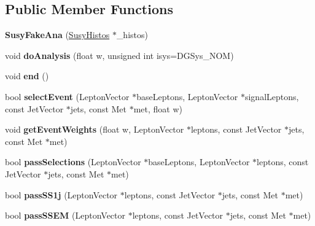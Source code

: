 \subsection*{Public Member Functions}
\begin{DoxyCompactItemize}
\item 
\hypertarget{classSusyFakeAna_ac092fb9efc326ae084d888501bdfa818}{
{\bfseries SusyFakeAna} (\hyperlink{classSusyHistos}{SusyHistos} $\ast$\_\-histos)}
\label{classSusyFakeAna_ac092fb9efc326ae084d888501bdfa818}

\item 
\hypertarget{classSusyFakeAna_a28b10622b8d67eacee73cf2e1999903f}{
void {\bfseries doAnalysis} (float w, unsigned int isys=DGSys\_\-NOM)}
\label{classSusyFakeAna_a28b10622b8d67eacee73cf2e1999903f}

\item 
\hypertarget{classSusyFakeAna_a6b73ce1990391a6b0c56f866f7212d47}{
void {\bfseries end} ()}
\label{classSusyFakeAna_a6b73ce1990391a6b0c56f866f7212d47}

\item 
\hypertarget{classSusyFakeAna_a78bf4f98f92485fa76342ec8b2d628c7}{
bool {\bfseries selectEvent} (LeptonVector $\ast$baseLeptons, LeptonVector $\ast$signalLeptons, const JetVector $\ast$jets, const Met $\ast$met, float w)}
\label{classSusyFakeAna_a78bf4f98f92485fa76342ec8b2d628c7}

\item 
\hypertarget{classSusyFakeAna_aadf34572b99c75663a542a95b65b8539}{
void {\bfseries getEventWeights} (float w, LeptonVector $\ast$leptons, const JetVector $\ast$jets, const Met $\ast$met)}
\label{classSusyFakeAna_aadf34572b99c75663a542a95b65b8539}

\item 
\hypertarget{classSusyFakeAna_ac10b9f9e353c44f69ffa1076c0350060}{
bool {\bfseries passSelections} (LeptonVector $\ast$baseLeptons, LeptonVector $\ast$leptons, const JetVector $\ast$jets, const Met $\ast$met)}
\label{classSusyFakeAna_ac10b9f9e353c44f69ffa1076c0350060}

\item 
\hypertarget{classSusyFakeAna_ab5e76910363fb5470554ae3b8f5f6028}{
bool {\bfseries passSS1j} (LeptonVector $\ast$leptons, const JetVector $\ast$jets, const Met $\ast$met)}
\label{classSusyFakeAna_ab5e76910363fb5470554ae3b8f5f6028}

\item 
\hypertarget{classSusyFakeAna_a8510cb05b385d9ce2e06c235d6695675}{
bool {\bfseries passSSEM} (LeptonVector $\ast$leptons, const JetVector $\ast$jets, const Met $\ast$met)}
\label{classSusyFakeAna_a8510cb05b385d9ce2e06c235d6695675}


\end{DoxyCompactItemize}
